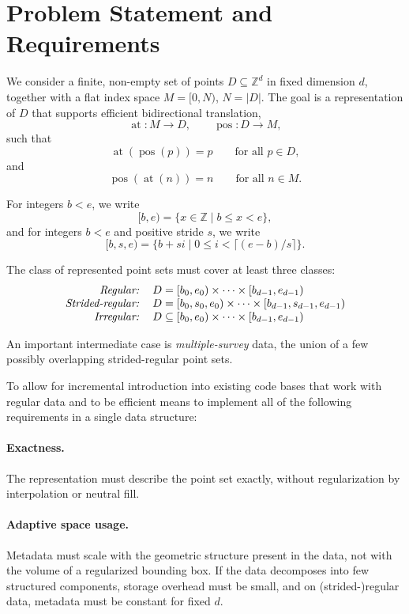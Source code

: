 \documentclass[manuscript,screen,review]{acmart}
\theoremstyle{definition}
\theoremstyle{plain}
\begin{document}
\section{Problem Statement and Requirements}
\label{section:requirements}

We consider a finite, non-empty set of points $D \subseteq \mathbb{Z}^d$
in fixed dimension $d$, together with a flat index space
$M = [0,N)$, $N = |D|$.
The goal is a representation of $D$ that supports efficient bidirectional translation,
\[
  \operatorname{at} : M \to D,
  \qquad
  \operatorname{pos} : D \to M,
\]
such that
\[
  \operatorname{at}(\operatorname{pos}(p)) = p
  \qquad\text{for all } p \in D,
\]
and
\[
  \operatorname{pos}(\operatorname{at}(n)) = n
  \qquad\text{for all } n \in M.
\]

For integers $b < e$, we write
\[
  [b,e) = \{x \in \mathbb{Z} \mid b \le x < e\},
\]
and for integers $b < e$ and positive stride $s$, we write
\[
  [b,s,e) = \{ b + s i \mid 0 \le i < \lceil (e-b)/s \rceil \}.
\]

The class of represented point sets must cover at least three classes:
\[
\begin{tabular}{rl}
\emph{Regular:} & $D = [b_0, e_0) \times \cdots \times [b_{d-1}, e_{d-1})$
\\
\emph{Strided-regular:} & $D = [b_0, s_0, e_0) \times \cdots \times [b_{d-1}, s_{d-1}, e_{d-1})$
\\
\emph{Irregular:} & $D \subseteq [b_0, e_0) \times \cdots \times [b_{d-1}, e_{d-1})$
\end{tabular}
\]

An important intermediate case is \emph{multiple-survey} data, the
union of a few possibly overlapping strided-regular point sets.

To allow for incremental introduction into existing code bases that
work with regular data and to be efficient means to implement all of
the following requirements in a single data structure:

\paragraph{Exactness.}
The representation must describe the point set exactly, without regularization by interpolation or neutral fill.

\paragraph{Adaptive space usage.}
Metadata must scale with the geometric structure present in the data,
not with the volume of a regularized bounding box. If the data
decomposes into few structured components, storage overhead must be
small, and on (strided-)regular data, metadata must be constant for fixed $d$.
\end{document}
